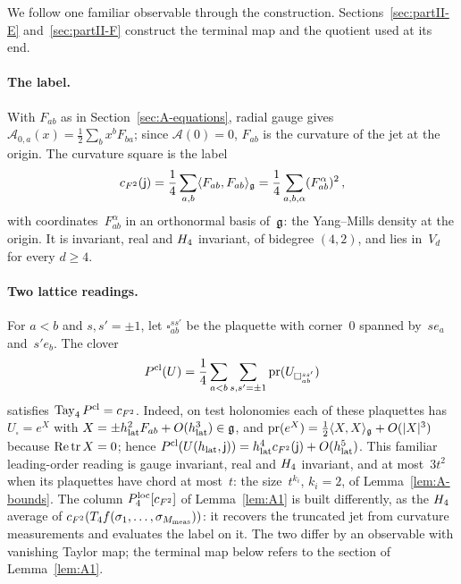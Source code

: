 We follow one familiar observable through the construction. Sections~\ref{sec:partII-E} and~\ref{sec:partII-F} construct the terminal map and the quotient used at its end.

\paragraph{The label.} With $F_{ab}$ as in Section~\ref{sec:A-equations}, radial gauge gives $\mathcal A_{0,a}(x)=\frac12\sum_bx^bF_{ba}$; since $\mathcal A(0)=0$, $F_{ab}$ is the curvature of the jet at the origin. The curvature square is the label
\begin{equation*}
c_{F^2}(\mathsf j)=\frac14\sum_{a,b}\langle F_{ab},F_{ab}\rangle_{\mathfrak{g}}=\frac14\sum_{a,b,\alpha}(F_{ab}^\alpha)^2\,,
\end{equation*}
with coordinates~$F^\alpha_{ab}$ in an orthonormal basis of~$\mathfrak{g}$: the Yang--Mills density at the origin. It is invariant, real and $H_4$ invariant, of bidegree $(4,2)$, and lies in~$V_d$ for every $d\ge4$.

\paragraph{Two lattice readings.} For $a<b$ and $s,s'=\pm1$, let $\square_{ab}^{ss'}$ be the plaquette with corner~$0$ spanned by~$se_a$ and~$s'e_b$. The clover
\begin{equation*}
P^{\rm cl}(U)=\frac14\sum_{a<b}\sum_{s,s'=\pm1}\operatorname{pr}(U_{\square_{ab}^{ss'}})
\end{equation*}
satisfies $\operatorname{Tay}_{4}P^{\rm cl}=c_{F^2}$. Indeed, on test holonomies each of these plaquettes has $U_\square=e^X$ with $X=\pm h_{\rm lat}^2F_{ab}+O(h_{\rm lat}^3)\in\mathfrak{g}$, and $\operatorname{pr}(e^X)=\frac12\langle X,X\rangle_{\mathfrak{g}}+O(|X|^3)$ because $\operatorname{Re}\operatorname{tr} X=0$; hence $P^{\rm cl}(U(h_{\rm lat},\mathsf j))=h_{\rm lat}^4c_{F^2}(\mathsf j)+O(h_{\rm lat}^5)$. This familiar leading-order reading is gauge invariant, real and $H_4$ invariant, and at most~$3t^2$ when its plaquettes have chord at most~$t$: the size~$t^{k_i}$, $k_i=2$, of Lemma~\ref{lem:A-bounds}. The column $P_{4}^{\mathrm{loc}}[c_{F^2}]$ of Lemma~\ref{lem:A1} is built differently, as the $H_4$ average of $c_{F^2}(T_4f(\sigma_1,\ldots,\sigma_{M_{\rm meas}}))$: it recovers the truncated jet from curvature measurements and evaluates the label on it. The two differ by an observable with vanishing Taylor map; the terminal map below refers to the section of Lemma~\ref{lem:A1}.

